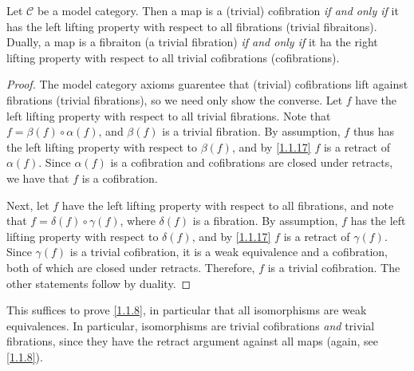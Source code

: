 \begin{lemma}\label{1.1.18}
	Let $\mathcal{C} $ be a model category. Then a map is a (trivial) cofibration \emph{if and only if} it has the left lifting property with respect to all fibrations (trivial fibraitons). Dually, a map is a fibraiton (a trivial fibration) \emph{if and only if} it ha the right lifting property with respect to all trivial cofibrations (cofibrations).
\end{lemma}
\begin{proof}
	The model category axioms guarentee that (trivial) cofibrations lift against fibrations (trivial fibrations), so we need only show the converse. Let $f$ have the left lifting property with respect to all trivial fibrations. Note that $f=\beta(f)\circ \alpha(f)$, and $\beta(f)$ is a trivial fibration. By assumption, $f$ thus has the left lifting property with respect to $\beta(f)$, and by \cref{1.1.17} $f$ is a retract of $\alpha(f)$. Since $\alpha(f)$ is a cofibration and cofibrations are closed under retracts, we have that $f$ is a cofibration.

	Next, let $f$ have the left lifting property with respect to all fibrations, and note that $f=\delta(f)\circ \gamma(f)$, where $\delta(f)$ is a fibration. By assumption, $f$ has the left lifting property with respect to $\delta(f)$, and by \cref{1.1.17} $f$ is a retract of $\gamma(f)$. Since $\gamma(f)$ is a trivial cofibration, it is a weak equivalence and a cofibration, both of which are closed under retracts. Therefore, $f$ is a trivial cofibration. The other statements follow by duality.
\end{proof}

\begin{remark}\label{1.1.19}
	This suffices to prove \cref{1.1.8}, in particular that all isomorphisms are weak equivalences. In particular, isomorphisms are trivial cofibrations \emph{and} trivial fibrations, since they have the retract argument against all maps (again, see \cref{1.1.8}).
\end{remark}

